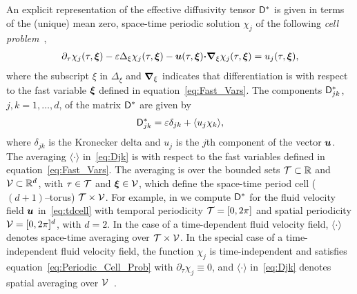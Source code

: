 \documentclass[amsa]{ipart}
\begin{document}
An explicit representation of the
effective diffusivity tensor $\mathsf{D}^*$ is given in terms of the (unique)
mean zero, space-time periodic solution $\chi_j$ of the following
\emph{cell problem}~\cite{Biferale:PF:2725,Majda:Kramer:1999:book}, 
%
\begin{align}\label{eq:Periodic_Cell_Prob}
  \partial_\tau\chi_j(\tau,\vecxi)
  -\varepsilon\Delta_\xi\chi_j(\tau,\vecxi)
  -\vecu(\tau,\vecxi) \bcdot\bnabla_\xi \chi_j(\tau,\vecxi)
  =u_j(\tau,\vecxi),
\end{align}
%
where the subscript $\xi$ in $\Delta_\xi$ and $\mbox{\boldmath${\nabla}$}_\xi$
indicates that differentiation is with respect to the fast variable
$\boldsymbol{\xi}$ defined in equation~\eqref{eq:Fast_Vars}. The components
$\mathsf{D}^*_{jk}$, $j,k=1,\ldots,d$, of the matrix $\mathsf{D}^*$ are given 
by~\cite{McLaughlin:SIAM_JAM:780,Fannjiang:1994:SIAM_JAM:333,Novikov:2005:CPAM:867,Majda:Kramer:1999:book}          
%
\begin{align}\label{eq:Djk}
  \Dm^*_{jk}=\varepsilon\delta_{jk}+\langle u_j\chi_k\rangle,
\end{align}
%
where $\delta_{jk}$ is the Kronecker delta and $u_j$ is the $j$th component
of the vector $\boldsymbol{u}$. The averaging $\langle\cdot\rangle$ in~\eqref{eq:Djk} is with
respect to the fast variables defined in
equation~\eqref{eq:Fast_Vars}. The averaging is over the bounded
sets $\mathcal{T}\subset\mathbb{R}$ and $\mathcal{V}\subset\mathbb{R}^d$, with $\tau\in\mathcal{T}$ and
$\boldsymbol{\xi}\in\mathcal{V}$, which define the space-time period cell ($(d+1)$--torus)
$\mathcal{T}\times\mathcal{V}$. For example, in  we compute $\mathsf{D}^*$
for the fluid velocity field $\boldsymbol{u}$ in~\eqref{eq:tdcell} with
temporal periodicity $\mathcal{T}=[0,2\pi]$ and spatial periodicity
$\mathcal{V}=[0,2\pi]^d$, with $d=2$. In the case of a 
time-dependent fluid velocity field, $\langle\cdot\rangle$ 
denotes space-time averaging over $\mathcal{T}\times\mathcal{V}$. In the special case of a
time-independent fluid velocity field, the function $\chi_j$ is
time-independent and satisfies equation~\eqref{eq:Periodic_Cell_Prob}
with $\partial_\tau\chi_j\equiv0$, and $\langle\cdot\rangle$ in~\eqref{eq:Djk} denotes spatial averaging over
$\mathcal{V}$~\cite{Fannjiang:1994:SIAM_JAM:333,Novikov:2005:CPAM:867,Majda:Kramer:1999:book}.
\end{document}
